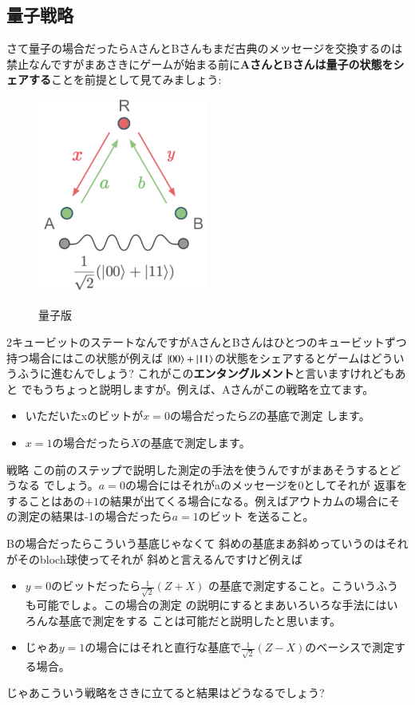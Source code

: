 \subsection{量子戦略}
さて量子の場合だったらAさんとBさんもまだ古典のメッセージを交換するのは禁止なんですがまあさきにゲームが始まる前に\textbf{AさんとBさんは量子の状態をシェアする}ことを前提として見てみましょう:
\begin{figure}[H]
    \centering
    \includegraphics[width=0.5\textwidth]{lesson4/CHSH_quantum_diagram.pdf}
    \label{fig: 1}
    \begin{center}
        \caption{量子版}
    \end{center}
\end{figure}
2キュービットのステートなんですがAさんとBさんはひとつのキュービットずつ持つ場合にはこの状態が例えば
$\ket{00} + \ket{11}$の状態をシェアするとゲームはどういうふうに進むんでしょう?
これがこの\textbf{エンタングルメント}と言いますけれどもあと
でもうちょっと説明しますが。例えば、Aさんがこの戦略を立てます。
\begin{itemize}
    \item いただいたxのビットが$x=0$の場合だったら$Z$の基底で測定
します。
    \item $x = 1$の場合だったら$X$の基底で測定します。
\end{itemize}戦略
この前のステップで説明した測定の手法を使うんですがまあそうするとどうなる
でしょう。$a = 0$の場合にはそれがaのメッセージを0としてそれが
返事をすることはあの$+1$の結果が出てくる場合になる。例えばアウトカムの場合にその測定の結果は-1の場合だったら$a=1$のビット
を送ること。

Bの場合だったらこういう基底じゃなくて
斜めの基底まあ斜めっていうのはそれがそのbloch球使ってそれが
斜めと言えるんですけど例えば
\begin{itemize}
    \item $y=0$のビットだったら$\frac{1}{\sqrt{2}}(Z + X)$
の基底で測定すること。こういうふうも可能でしょ。この場合の測定
の説明にするとまあいろいろな手法にはいろんな基底で測定をする
ことは可能だと説明したと思います。
    \item じゃあ$y=1$の場合にはそれと直行な基底で$\frac{1}{\sqrt{2}}(Z-X)$のベーシスで測定する場合。
\end{itemize}
じゃあこういう戦略をさきに立てると結果はどうなるでしょう?

